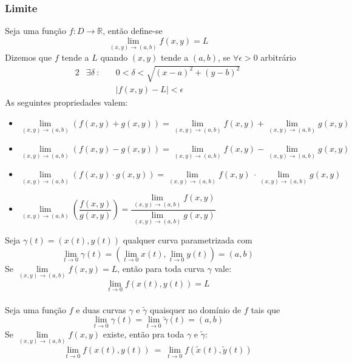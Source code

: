 \documentclass{article}
\begin{document}
\subsubsection{Limite}
Seja uma função $f: D \rightarrow \mathbb{R}$, então define-se
\[ \lim_{(x,y) \to (a,b)} f(x,y) = L \]
Dizemos que $f$ tende a $L$ quando $(x,y)$ tende a $(a,b)$, se $\forall \epsilon > 0$ arbitrário
\begin{alignat*}{2}
  &\exists \delta \> : && \> 0 < \delta < \sqrt{ {(x-a)}^2 + {(y-b)}^2 }\\
                     & && \> \left| f(x,y) - L \right| < \epsilon
\end{alignat*}
As seguintes propriedades valem:
\begin{itemize}
  \item $\lim\limits_{(x,y)\to(a,b)} (f(x,y) + g(x,y)) = \lim\limits_{(x,y)\to(a,b)} f(x,y) + \lim\limits_{(x,y)\to(a,b)} g(x,y) $\\
  \item $\lim\limits_{(x,y)\to(a,b)} (f(x,y) - g(x,y)) = \lim\limits_{(x,y)\to(a,b)} f(x,y) - \lim\limits_{(x,y)\to(a,b)} g(x,y) $\\
  \item $\lim\limits_{(x,y)\to(a,b)} (f(x,y) \cdot g(x,y)) = \lim\limits_{(x,y)\to(a,b)} f(x,y) \> \cdot \lim\limits_{(x,y)\to(a,b)} g(x,y) $\\
  \item $\lim\limits_{(x,y)\to(a,b)} \left( \dfrac{f(x,y)}{g(x,y)} \right) = \dfrac{\lim\limits_{(x,y)\to(a,b)} f(x,y)}{\lim\limits_{(x,y)\to(a,b)} g(x,y)} $\\
\end{itemize}
\vspace{30pt}
Seja $\gamma(t) = (x(t), y(t))$ qualquer curva parametrizada com
\[ \lim_{t\to0} \gamma(t) = (\lim_{t\to0} x(t), \lim_{t\to0} y(t)) = (a,b) \]
Se $\lim\limits_{(x,y)\to(a,b)} f(x,y) = L$, então para toda curva $\gamma$ vale:\\[-5pt]
\[ \lim_{t\to0} f(x(t), y(t)) = L \]
\vspace{30pt}\\
Seja uma função $f$ e duas curvas $\gamma$ e $\widetilde\gamma$ quaisquer no domínio de $f$ tais que
\[ \lim_{t \to 0} \gamma(t) = \lim_{t \to 0} \widetilde\gamma(t) = (a,b) \]
Se $\lim\limits_{(x,y) \to (a,b)} f(x,y)$ existe, então pra toda $\gamma$ e $\widetilde\gamma$:\\[-5pt]
\[ \lim_{t \to 0} f(x(t), y(t)) \> = \> \lim_{t \to 0} f(\widetilde{x}(t), \widetilde{y}(t)) \]
\end{document}
